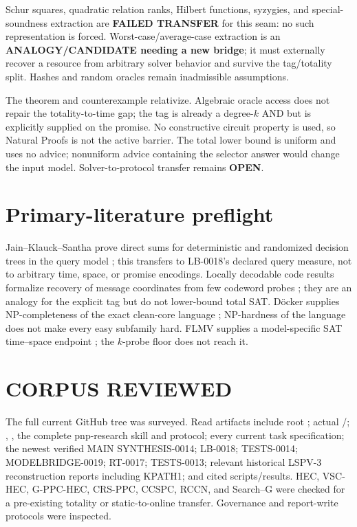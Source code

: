 \documentclass[11pt]{article}
\newcommand{\OPEN}{\textbf{OPEN}}
\begin{document}
Schur squares, quadratic relation ranks, Hilbert functions, syzygies, and
special-soundness extraction are \textbf{FAILED TRANSFER} for this seam: no
such representation is forced.  Worst-case/average-case extraction is an
\textbf{ANALOGY/CANDIDATE needing a new bridge}; it must externally recover a
resource from arbitrary solver behavior and survive the tag/totality split.
Hashes and random oracles remain inadmissible assumptions.

The theorem and counterexample relativize.  Algebraic oracle access does not
repair the totality-to-time gap; the tag is already a degree-$k$ AND but is
explicitly supplied on the promise.  No constructive circuit property is
used, so Natural Proofs is not the active barrier.  The total lower bound is
uniform and uses no advice; nonuniform advice containing the selector answer
would change the input model.  Solver-to-protocol transfer remains \OPEN.

\section{Primary-literature preflight}

Jain--Klauck--Santha prove direct sums for deterministic and randomized
decision trees in the query model \cite{JKS}; this transfers to LB-0018's
declared query measure, not to arbitrary time, space, or promise encodings.
Locally decodable code results formalize recovery of message coordinates from
few codeword probes \cite{KdW}; they are an analogy for the explicit tag but
do not lower-bound total SAT.  D\"ocker supplies NP-completeness of the exact
clean-core language \cite{Doecker}; NP-hardness of the language does not make
every easy subfamily hard.  FLMV supplies a model-specific SAT time--space
endpoint \cite{FLMV}; the $k$-probe floor does not reach it.

\section{CORPUS REVIEWED}

The full current GitHub tree was surveyed.  Read artifacts include root
; actual /;
, , the complete pnp-research skill and
protocol; every current task specification; the newest verified MAIN
SYNTHESIS-0014; LB-0018; TESTS-0014; MODELBRIDGE-0019; RT-0017;
TESTS-0013; relevant historical LSPV-3 reconstruction reports including
KPATH1; and cited scripts/results.  HEC, VSC-HEC, G-PPC-HEC, CRS-PPC, CCSPC,
RCCN, and Search--G were checked for a pre-existing totality or static-to-online
transfer.  Governance and report-write protocols were inspected.
\end{document}
